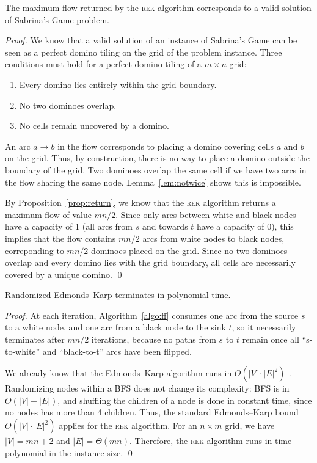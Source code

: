 \documentclass[svgnames,table,runningheads]{llncs}
\newcommand{\rek}{\textsc{rek}\xspace}
\begin{document}
\begin{corollary}\label{cor:correct}
  The maximum flow returned by the \rek algorithm corresponds to a valid solution of Sabrina's Game problem.
\end{corollary}
\begin{proof}
  We know that a valid solution of an instance of Sabrina's Game can be seen as a perfect domino tiling on the grid of the problem instance.
  Three conditions must hold for a perfect domino tiling of a \(m\times n\) grid:
  \begin{enumerate}
    \item Every domino lies entirely within the grid boundary.
    \item No two dominoes overlap.
    \item No cells remain uncovered by a domino.
  \end{enumerate}
  
\noindent An arc \(a\rightarrow b\) in the flow corresponds to placing a domino covering cells \(a\) and \(b\) on the grid. Thus, by construction, there is no way to place a domino outside the boundary of the grid. Two dominoes overlap the same cell if we have two arcs in the flow sharing the same node. Lemma~\ref{lem:notwice} shows this is impossible.

By Proposition~\ref{prop:return}, we know that the \rek algorithm returns a maximum flow of value $mn/2$. Since only arcs between white and black nodes have a capacity of 1 (all arcs from \(s\) and towards \(t\) have a capacity of 0), this implies that the flow contains $mn/2$ arcs from white nodes to black nodes, correponding to $mn/2$ dominoes placed on the grid. Since no two dominoes overlap and every domino lies with the grid boundary, all cells are necessarily covered by a unique domino. \qed
\end{proof}

\begin{proposition}\label{prop:complexity}
  Randomized Edmonds--Karp terminates in polynomial time.
\end{proposition}
\begin{proof}
  At each iteration, Algorithm~\ref{algo:ff} consumes one arc from the source \(s\) to a white node, and one arc from a black node to the sink \(t\), so it necessarily terminates after \(mn/2\) iterations, because no paths from \(s\) to \(t\) remain once all ``s-to-white'' and ``black-to-t'' arcs have been flipped.

  We already know that the Edmonds--Karp algorithm runs in $O(|V|\cdot |E|^2)$~\cite{edmondskarp1972}. Randomizing nodes within a BFS does not change its complexity: BFS is in \(O(|V|+|E|)\), and shuffling the children of a node is done in constant time, since no nodes has more than 4 children. Thus, the standard Edmonds--Karp bound $O(|V|\cdot |E|^2)$ applies for the \rek algorithm. For an $n\times m$ grid, we have $|V|=mn+2$ and $|E|=\Theta(mn)$. Therefore, the \rek algorithm runs in time polynomial in the instance size. \qed
\end{proof}
\end{document}
